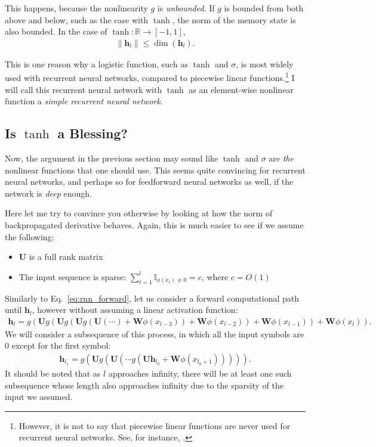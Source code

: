 \documentclass{report}
\newcommand{\vect}[1]{\mathbf{#1}}
\newcommand{\matr}[1]{\mathbf{#1}}
\newcommand{\vh}[0]{\vect{h}}
\newcommand{\mW}[0]{\matr{W}}
\newcommand{\mU}[0]{\matr{U}}
\newcommand{\RR}[0]{\mathbb{R}}
\newcommand{\II}[0]{\mathbb{I}}
\newcommand{\sigmoid}{\sigma}
\begin{document}
This happens, because the nonlinearity $g$ is {\em unbounded}. If $g$ is bounded
from both above and below, such as the case with $\tanh$, the norm of the memory
state is also bounded. In the case of $\tanh:\RR \to \left[ -1, 1\right]$,
\begin{align*}
    \|\vh_l\|\leq \dim(\vh_l).
\end{align*}

This is one reason why a logistic function, such as $\tanh$ and $\sigmoid$, is
most widely used with recurrent neural networks, compared to piecewise linear
functions.\footnote{
    However, it is not to say that piecewise linear functions are never used for
    recurrent neural networks. See, for instance,
    \cite{le2015simple,bengio2013advances}.
} I will call this recurrent neural network with $\tanh$ as an element-wise
nonlinear function a {\em simple recurrent neural network}. 

\subsection{Is $\tanh$ a Blessing?}
\label{sec:vanishing_grad}

Now, the argument in the previous section may sound like $\tanh$ and $\sigmoid$
are {\em the} nonlinear functions that one should use. This seems quite
convincing for recurrent neural networks, and perhaps so for feedforward neural
networks as well, if the network is {\em deep} enough.

Here let me try to convince you otherwise by looking at how the norm of
backpropagated derivative behaves. Again, this is much easier to see if we
assume the following:
\begin{itemize}
    \itemsep 0em
    \item $\mU$ is a full rank matrix
    \item The input sequence is sparse: $\sum_{t=1}^l \II_{\phi(x_t) \neq 0} =
        c$, where $c=O(1)$
\end{itemize}

Similarly to Eq.~\eqref{eq:rnn_forward}, let us consider a forward computational
path until $\vh_l$, however without assuming a linear activation function:
\begin{align*}
    \vh_l = g\left(\mU g\left(\mU g\left(\mU g\left(\mU \left( \cdots \right)
                + \mW \phi\left(x_{l-3}\right)\right) + \mW
        \phi\left(x_{l-2}\right)\right)+\mW \phi\left(x_{l-1}\right)\right) +
    \mW\phi\left(x_{l}\right)\right).
\end{align*}
We will consider a subsequence of this process, in which all the input symbols
are $0$ except for the first symbol:
\begin{align*}
    \vh_{l_1} = g\left(\mU g\left(\mU \left( \cdots g\left(\mU \vh_{l_0} + \mW
    \phi\left(x_{l_0+1}\right)\right)\right)\right)\right).
\end{align*}
It should be noted that as $l$ approaches
infinity, there will be at least one such subsequence whose length also
approaches infinity due to the sparsity of the input we assumed.
\end{document}
